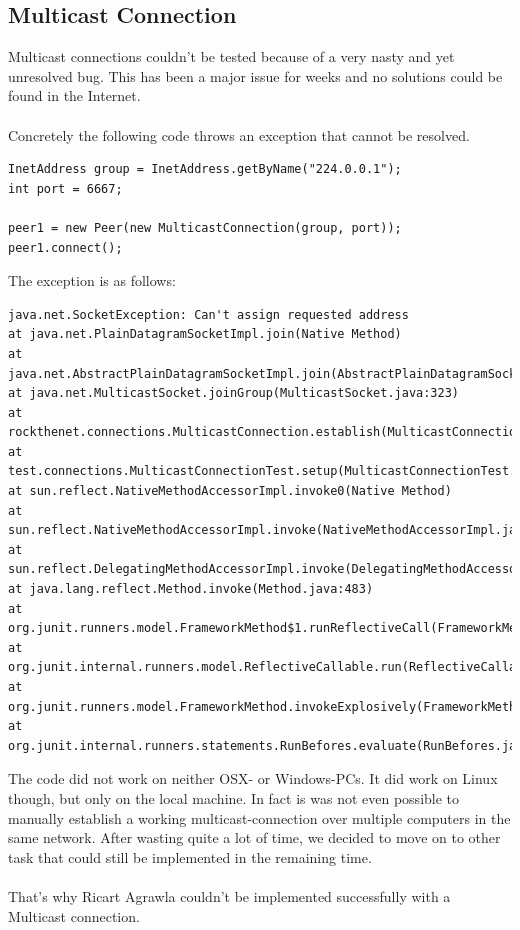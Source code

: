 \documentclass[11pt, a4paper]{article}
\begin{document}
\subsection{Multicast Connection}

Multicast connections couldn't be tested because of a very nasty and yet unresolved bug. This has been a major issue for weeks and no solutions could be found in the Internet. 
\\\\
Concretely the following code throws an exception that cannot be resolved. 

\begin{lstlisting}
InetAddress group = InetAddress.getByName("224.0.0.1");
int port = 6667;

peer1 = new Peer(new MulticastConnection(group, port));
peer1.connect();
\end{lstlisting}

The exception is as follows:

\begin{lstlisting}
java.net.SocketException: Can't assign requested address
at java.net.PlainDatagramSocketImpl.join(Native Method)
at java.net.AbstractPlainDatagramSocketImpl.join(AbstractPlainDatagramSocketImpl.java:178)
at java.net.MulticastSocket.joinGroup(MulticastSocket.java:323)
at rockthenet.connections.MulticastConnection.establish(MulticastConnection.java:48)
at test.connections.MulticastConnectionTest.setup(MulticastConnectionTest.java:29)
at sun.reflect.NativeMethodAccessorImpl.invoke0(Native Method)
at sun.reflect.NativeMethodAccessorImpl.invoke(NativeMethodAccessorImpl.java:62)
at sun.reflect.DelegatingMethodAccessorImpl.invoke(DelegatingMethodAccessorImpl.java:43)
at java.lang.reflect.Method.invoke(Method.java:483)
at org.junit.runners.model.FrameworkMethod$1.runReflectiveCall(FrameworkMethod.java:47)
at org.junit.internal.runners.model.ReflectiveCallable.run(ReflectiveCallable.java:12)
at org.junit.runners.model.FrameworkMethod.invokeExplosively(FrameworkMethod.java:44)
at org.junit.internal.runners.statements.RunBefores.evaluate(RunBefores.java:24)
\end{lstlisting}

The code did not work on neither OSX- or Windows-PCs. It did work on Linux though, but only on the local machine. In fact is was not even possible to manually establish a working multicast-connection over multiple computers in the same network. After wasting quite a lot of time, we decided to move on to other task that could still be implemented in the remaining time.
\\\\
That's why Ricart Agrawla couldn't be implemented successfully with a Multicast connection. 
\end{document}
